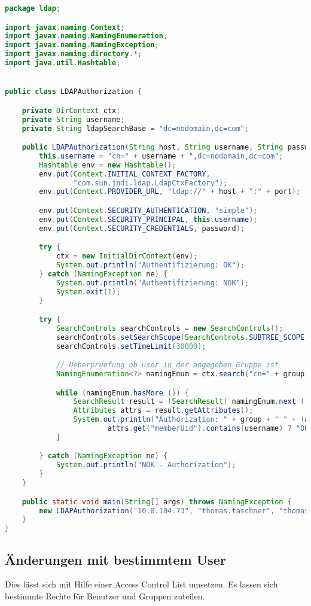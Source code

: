 \begin{lstlisting}[frame=single, language=java, caption=Java Code zur LDAP Autorisierung]
package ldap;

import javax.naming.Context;
import javax.naming.NamingEnumeration;
import javax.naming.NamingException;
import javax.naming.directory.*;
import java.util.Hashtable;


public class LDAPAuthorization {

	private DirContext ctx;
	private String username;
	private String ldapSearchBase = "dc=nodomain,dc=com";

	public LDAPAuthorization(String host, String username, String password, int port, String group) {
		this.username = "cn=" + username + ",dc=nodomain,dc=com";
		Hashtable env = new Hashtable();
		env.put(Context.INITIAL_CONTEXT_FACTORY,
				"com.sun.jndi.ldap.LdapCtxFactory");
		env.put(Context.PROVIDER_URL, "ldap://" + host + ":" + port);

		env.put(Context.SECURITY_AUTHENTICATION, "simple");
		env.put(Context.SECURITY_PRINCIPAL, this.username);
		env.put(Context.SECURITY_CREDENTIALS, password);

		try {
			ctx = new InitialDirContext(env);
			System.out.println("Authentifizierung: OK");
		} catch (NamingException ne) {
			System.out.println("Authentifizierung: NOK");
			System.exit(1);
		}

		try {
			SearchControls searchControls = new SearchControls();
			searchControls.setSearchScope(SearchControls.SUBTREE_SCOPE);
			searchControls.setTimeLimit(30000);

			// Ueberpruefung ob user in der angegeben Gruppe ist
			NamingEnumeration<?> namingEnum = ctx.search("cn=" + group + ",dc=nodomain,dc=com", "(objectclass=posixGroup)", searchControls);

			while (namingEnum.hasMore ()) {
				SearchResult result = (SearchResult) namingEnum.next ();
				Attributes attrs = result.getAttributes();
				System.out.println("Authorization: " + group + " " + (attrs.get("memberUID") != null &&
						attrs.get("memberUid").contains(username) ? "OK" : "NOK"));
			}

		} catch (NamingException ne) {
			System.out.println("NOK - Authorization");
		}
	}

	public static void main(String[] args) throws NamingException {
		new LDAPAuthorization("10.0.104.73", "thomas.taschner", "thomas.taschner", 389, "group.service1");
	}
}
\end{lstlisting}

\subsection{Änderungen mit bestimmtem User}
\label{sec:Änderungen mit bestimmtem User}
Dies lässt sich mit Hilfe einer Access Control List umsetzen. Es lassen sich bestimmte Rechte für Benutzer und Gruppen zuteilen.